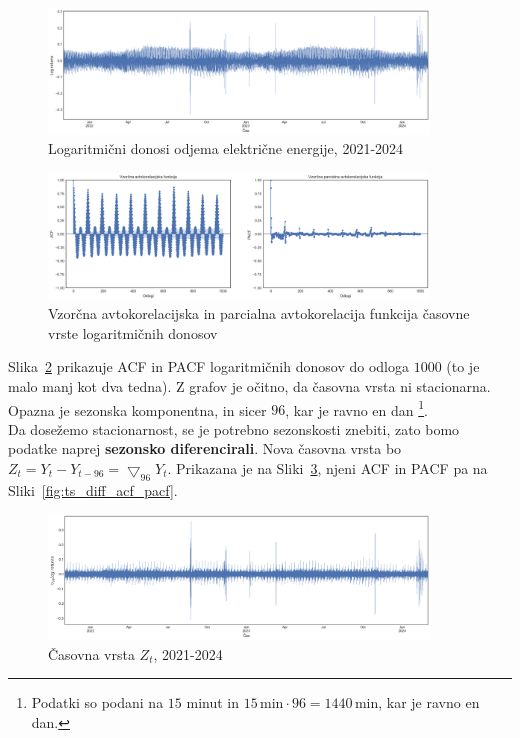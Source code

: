 \documentclass[a4paper, 11pt]{article}
\begin{document}
\begin{figure}[h!]
    \centering
    \caption{Logaritmični donosi odjema električne energije, 2021-2024}\par\medskip
    \label{fig:log_returns}
    \includegraphics[width=0.9\textwidth]{log_returns.png}
\end{figure}

\begin{figure}[h!]
    \centering
    \caption{Vzorčna avtokorelacijska in parcialna avtokorelacija funkcija časovne vrste logaritmičnih donosov}\par\medskip
    \label{fig:log_returns_acf_pacf}
    \includegraphics[width=0.9\textwidth]{log_returns_acf_pacf.png}
\end{figure}

\noindent Slika~\ref{fig:log_returns_acf_pacf} prikazuje 
ACF in PACF logaritmičnih donosov do odloga $1000$ (to je
malo manj kot dva tedna). Z grafov je očitno, da časovna vrsta ni stacionarna. Opazna je sezonska komponentna, in sicer $96$, 
kar je ravno en dan \footnote{Podatki so podani na $15$ minut in $15\,\text{min} \cdot 96 = 1440\,\text{min}$, kar je ravno en dan.}. \\

\noindent Da dosežemo stacionarnost, se je potrebno sezonskosti znebiti, zato bomo podatke naprej \textbf{sezonsko diferencirali}.
Nova časovna vrsta bo $Z_t = Y_t - Y_{t-96} = \bigtriangledown_{96}Y_t$. Prikazana je na Sliki~\ref{fig:ts_diff}, njeni ACF in PACF pa na Sliki~\ref{fig:ts_diff_acf_pacf}.

\begin{figure}[h!]
    \centering
    \caption{Časovna vrsta $Z_t$, 2021-2024}\par\medskip
    \label{fig:ts_diff}
    \includegraphics[width=0.9\textwidth]{ts_diff.png}
\end{figure}
\end{document}
